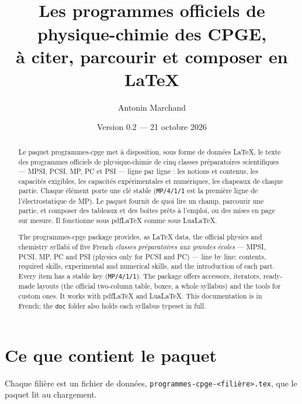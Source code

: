 \documentclass[a4paper,11pt]{article}
\title{\pkg{programmes-cpge}\\[0.4em]
  \large Les programmes officiels de physique-chimie des CPGE,\\
  à citer, parcourir et composer en \LaTeX}
\author{Antonin Marchand}
\date{Version 0.2 — 21 octobre 2026}
\newcommand\pkg[1]{\textsf{#1}}
\newcommand\cle[1]{\texttt{#1}}
\begin{document}
\maketitle

\begin{abstract}
Le paquet \pkg{programmes-cpge} met à disposition, sous forme de données \LaTeX,
le texte des programmes officiels de physique-chimie de cinq classes
préparatoires scientifiques — MPSI, PCSI, MP, PC et PSI — ligne par ligne : les
notions et contenus, les capacités exigibles, les capacités expérimentales et
numériques, les chapeaux de chaque partie. Chaque élément porte une clé stable
(\cle{MP/4/1/1} est la première ligne de l'électrostatique de MP). Le paquet
fournit de quoi lire un champ, parcourir une partie, et composer des tableaux
et des boîtes prêts à l'emploi, ou des mises en page sur mesure. Il fonctionne
sous pdf\LaTeX{} comme sous Lua\LaTeX.
\end{abstract}

\begin{otherlanguage}{english}
\begin{abstract}
The \pkg{programmes-cpge} package provides, as \LaTeX{} data, the official
physics and chemistry syllabi of five French \emph{classes préparatoires aux
grandes écoles} — MPSI, PCSI, MP, PC and PSI (physics only for PCSI and PC) —
line by line: contents, required skills, experimental and numerical skills,
and the introduction of each part. Every item has a stable key
(\cle{MP/4/1/1}). The package offers accessors, iterators, ready-made layouts
(the official two-column table, boxes, a whole syllabus) and the tools for
custom ones. It works with pdf\LaTeX{} and Lua\LaTeX. This documentation is
in French; the \texttt{doc} folder also holds each syllabus typeset in full.
\end{abstract}
\end{otherlanguage}

\tableofcontents

\section{Ce que contient le paquet}

Chaque filière est un fichier de données, \texttt{programmes-cpge-<filière>.tex},
que le paquet lit au chargement.
\end{document}
